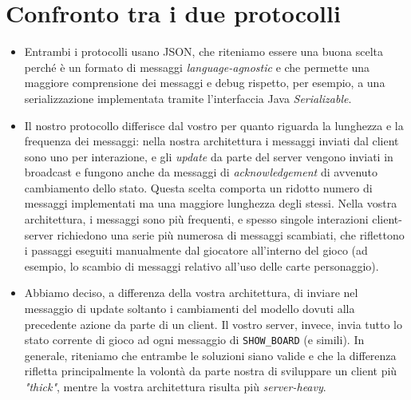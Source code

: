\documentclass{article}
\begin{document}
    \section{Confronto tra i due protocolli}
        \begin{itemize}
            \item Entrambi i protocolli usano JSON, che riteniamo essere una buona scelta perché
                è un formato di messaggi \textit{language-agnostic} e che permette una maggiore
                comprensione dei messaggi e debug rispetto, per esempio, a una serializzazione
                implementata tramite l'interfaccia Java \textit{Serializable}.
            \item Il nostro protocollo differisce dal vostro per quanto riguarda la lunghezza
                e la frequenza dei messaggi: nella nostra architettura i messaggi inviati dal
                client sono uno per interazione, e gli \textit{update} da parte del server 
                vengono inviati in broadcast e fungono anche da messaggi di \textit{acknowledgement}
                di avvenuto cambiamento dello stato. Questa scelta comporta un ridotto numero di
                messaggi implementati ma una maggiore lunghezza degli stessi.
                Nella vostra architettura, i messaggi sono più frequenti, e spesso singole
                interazioni client-server richiedono una serie più numerosa di messaggi scambiati,
                che riflettono i passaggi eseguiti manualmente dal giocatore all'interno del gioco
                (ad esempio, lo scambio di messaggi relativo all'uso delle carte personaggio).
            \item Abbiamo deciso, a differenza della vostra architettura, di inviare nel messaggio
                di update soltanto i cambiamenti del modello dovuti alla precedente azione da parte
                di un client. Il vostro server, invece, invia tutto lo stato corrente di gioco ad 
                ogni messaggio di \texttt{SHOW\_BOARD} (e simili). In generale, riteniamo che entrambe le soluzioni
                siano valide e che la differenza rifletta principalmente la volontà da parte nostra
                di sviluppare un client più \textit{"thick"}, mentre la vostra architettura risulta
                più \textit{server-heavy}.
        \end{itemize}
        
\end{document}
